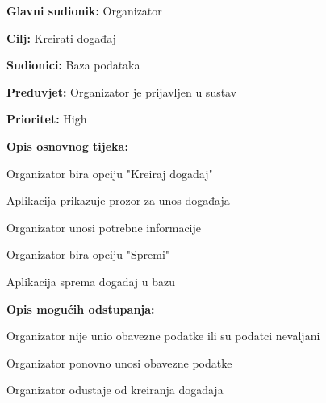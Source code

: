 \noindent {}
	\begin{packed_item}
		
		\item \textbf{Glavni sudionik:} Organizator 
		\item \textbf{Cilj:} Kreirati događaj
		\item \textbf{Sudionici:} Baza podataka
		\item \textbf{Preduvjet:} Organizator je prijavljen u sustav
		\item \textbf{Prioritet:} High
		\item \textbf{Opis osnovnog tijeka:} 
		
		\item[] \begin{packed_enum}
			
			\item Organizator bira opciju "Kreiraj događaj"
			\item Aplikacija prikazuje prozor za unos događaja
			\item Organizator unosi potrebne informacije
			\item Organizator bira opciju "Spremi"
			\item Aplikacija sprema događaj u bazu
		\end{packed_enum}
	
		\item  \textbf{Opis mogućih odstupanja:}
		\item[] \begin{packed_item}
			
			\item[4.a] Organizator nije unio obavezne podatke ili su podatci nevaljani
			\item[] \begin{packed_enum}
				\item Organizator ponovno unosi obavezne podatke
				\item Organizator odustaje od kreiranja događaja
			\end{packed_enum}	
			
		\end{packed_item} 
	\end{packed_item}
		
